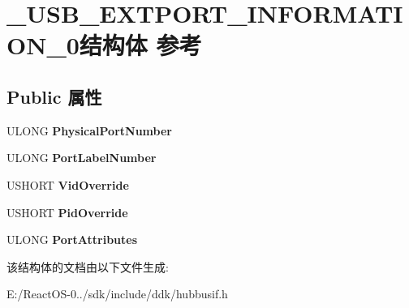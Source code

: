\hypertarget{struct___u_s_b___e_x_t_p_o_r_t___i_n_f_o_r_m_a_t_i_o_n__0}{}\section{\+\_\+\+U\+S\+B\+\_\+\+E\+X\+T\+P\+O\+R\+T\+\_\+\+I\+N\+F\+O\+R\+M\+A\+T\+I\+O\+N\+\_\+0结构体 参考}
\label{struct___u_s_b___e_x_t_p_o_r_t___i_n_f_o_r_m_a_t_i_o_n__0}
\subsection*{Public 属性}
\begin{DoxyCompactItemize}
\item 
\mbox{\label{struct___u_s_b___e_x_t_p_o_r_t___i_n_f_o_r_m_a_t_i_o_n__0_a231b19b3cc003c1cabc238bdd4177a6c}} 
U\+L\+O\+NG {\bfseries Physical\+Port\+Number}
\item 
\mbox{\label{struct___u_s_b___e_x_t_p_o_r_t___i_n_f_o_r_m_a_t_i_o_n__0_afd04a8aa3846bc7169a17b646a4bac36}} 
U\+L\+O\+NG {\bfseries Port\+Label\+Number}
\item 
\mbox{\label{struct___u_s_b___e_x_t_p_o_r_t___i_n_f_o_r_m_a_t_i_o_n__0_aecaebf1e841bb9f42dd5a27719b97d69}} 
U\+S\+H\+O\+RT {\bfseries Vid\+Override}
\item 
\mbox{\label{struct___u_s_b___e_x_t_p_o_r_t___i_n_f_o_r_m_a_t_i_o_n__0_ac4e6780ff1a3a922849b4814158896f2}} 
U\+S\+H\+O\+RT {\bfseries Pid\+Override}
\item 
\mbox{\label{struct___u_s_b___e_x_t_p_o_r_t___i_n_f_o_r_m_a_t_i_o_n__0_a5676b19f7c9126875f895bd8f77a9c65}} 
U\+L\+O\+NG {\bfseries Port\+Attributes}
\end{DoxyCompactItemize}


该结构体的文档由以下文件生成\+:\begin{DoxyCompactItemize}
\item 
E\+:/\+React\+O\+S-\/0../sdk/include/ddk/hubbusif.\+h\end{DoxyCompactItemize}
